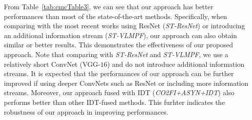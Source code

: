 \documentclass[letterpaper]{article} %
\begin{document}
From Table~\ref{tab:cmcTable3}, we can see that our approach has better performances than most of the state-of-the-art methods. Specifically, when comparing with the most recent works using ResNet (\emph{ST-ResNet}) or introducing an additional information stream (\emph{ST-VLMPF}), our approach can also obtain similar or better results. This demonstrates the effectiveness of our proposed approach. Note that comparing with \emph{ST-ResNet} and \emph{ST-VLMPF}, we use a relatively short ConvNet (VGG-$16$) and do not introduce additional information streams. It is expected that the performances of our approach can be further improved if using deeper ConvNets such as ResNet or including more information streams. Moreover, our approach fused with IDT (\emph{CO2FI+ASYN+IDT}) also performs better than other IDT-fused methods. This furhter indicates the robustness of our approach in improving performances.


\end{document}
